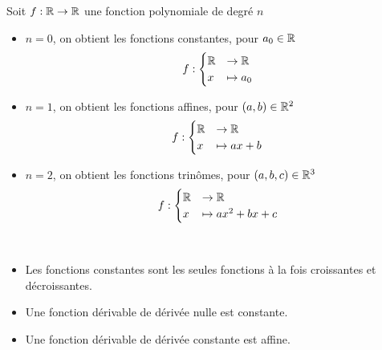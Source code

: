 \begin{graybox}
	\begin{proposition}[]
		\par Soit $f:\mathbb{R} \to \mathbb{R}$ une fonction polynomiale de degré $n$
		\begin{itemize}
			\item $n = 0$, on obtient les fonctions constantes, pour $a_0 \in \mathbb{R}$
			\begin{align*}
				f:
				\begin{cases}
					\mathbb{R} &\to \mathbb{R} \\
					x &\mapsto a_0
				\end{cases}
			\end{align*}
			\item $n = 1$, on obtient les fonctions affines, pour $(a, b) \in \mathbb{R}^2$
			\begin{align*}
				f:
				\begin{cases}
					\mathbb{R} &\to \mathbb{R} \\
					x &\mapsto ax + b
				\end{cases}
			\end{align*}
			\item $n = 2$, on obtient les fonctions trinômes, pour $(a, b, c) \in \mathbb{R}^3$
			\begin{align*}
				f:
				\begin{cases}
					\mathbb{R} &\to \mathbb{R} \\
					x &\mapsto ax^2 + bx + c
				\end{cases}
			\end{align*}
		\end{itemize}
	\end{proposition}
\end{graybox} 


\begin{remarque}~
	\begin{itemize}
		\item Les fonctions constantes sont les seules fonctions à la fois croissantes et décroissantes.
		\item Une fonction dérivable de dérivée nulle est constante.
		\item Une fonction dérivable de dérivée constante est affine.
	\end{itemize}
\end{remarque}


